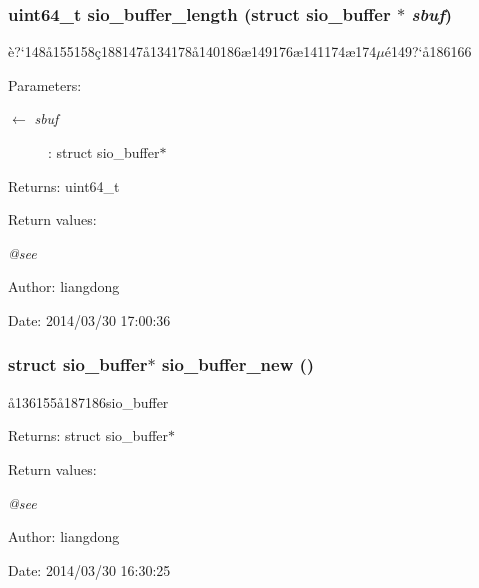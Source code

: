 \subsubsection{\setlength{\rightskip}{0pt plus 5cm}uint64\_\-t sio\_\-buffer\_\-length (struct sio\_\-buffer $\ast$ {\em sbuf})}\label{sio__buffer_8h_a6}


\`{e}?`148\aa{}155158\c{c}188147\aa{}134178\aa{}140186\ae{}149176\ae{}141174\ae{}174$\mu$\'{e}149?`\aa{}186166 

\begin{Desc}
\item[Parameters:]
\begin{description}
\item[\mbox{$\leftarrow$} {\em sbuf}]: struct sio\_\-buffer$\ast$ \end{description}
\end{Desc}
\begin{Desc}
\item[Returns:]uint64\_\-t \end{Desc}
\begin{Desc}
\item[Return values:]
\begin{description}
\item[{\em @see}]\end{description}
\end{Desc}
\begin{Desc}
\item[Author:]liangdong \end{Desc}
\begin{Desc}
\item[Date:]2014/03/30 17:00:36 \end{Desc}
\subsubsection{\setlength{\rightskip}{0pt plus 5cm}struct sio\_\-buffer$\ast$ sio\_\-buffer\_\-new ()}\label{sio__buffer_8h_a0}


\aa{}136155\aa{}187186sio\_\-buffer 

\begin{Desc}
\item[Returns:]struct sio\_\-buffer$\ast$ \end{Desc}
\begin{Desc}
\item[Return values:]
\begin{description}
\item[{\em @see}]\end{description}
\end{Desc}
\begin{Desc}
\item[Author:]liangdong \end{Desc}
\begin{Desc}
\item[Date:]2014/03/30 16:30:25 \end{Desc}

